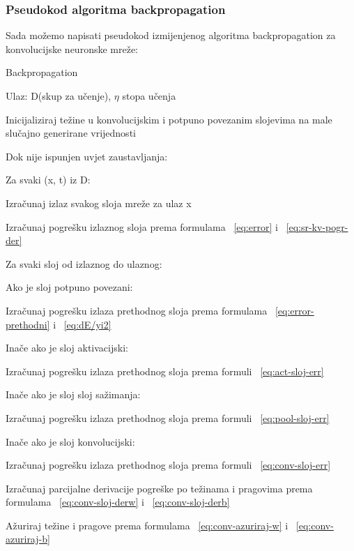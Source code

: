 \documentclass[times, utf8, zavrsni]{fer}
\begin{document}
\subsubsection{Pseudokod algoritma backpropagation}
Sada možemo napisati pseudokod izmijenjenog algoritma backpropagation za konvolucijske neuronske mreže:
\begin{algorithm}
\caption{Backpropagation}
\label{alg:backpropagation}
Ulaz: D(skup za učenje), $\eta$ stopa učenja

Inicijaliziraj težine u konvolucijskim i potpuno povezanim slojevima na male slučajno generirane vrijednosti\;

Dok nije ispunjen uvjet zaustavljanja:\;

Za svaki (x, t) iz D:

Izračunaj izlaz svakog sloja mreže za ulaz x

Izračunaj pogrešku izlaznog sloja prema formulama ~\ref{eq:error} i ~\ref{eq:sr-kv-pogr-der}

Za svaki sloj od izlaznog do ulaznog:

Ako je sloj potpuno povezani:

Izračunaj pogrešku izlaza prethodnog sloja prema formulama ~\ref{eq:error-prethodni} i ~\ref{eq:dE/yi2}

Inače ako je sloj aktivacijski:

Izračunaj pogrešku izlaza prethodnog sloja prema formuli ~\ref{eq:act-sloj-err}

Inače ako je sloj sloj sažimanja:

Izračunaj pogrešku izlaza prethodnog sloja prema formuli ~\ref{eq:pool-sloj-err}

Inače ako je sloj konvolucijski:

Izračunaj pogrešku izlaza prethodnog sloja prema formuli ~\ref{eq:conv-sloj-err}

Izračunaj parcijalne derivacije pogreške po težinama i pragovima prema formulama ~\ref{eq:conv-sloj-derw} i ~\ref{eq:conv-sloj-derb}

Ažuriraj težine i pragove prema formulama ~\ref{eq:conv-azuriraj-w} i ~\ref{eq:conv-azuriraj-b}
 	
\end{algorithm}
\end{document}
